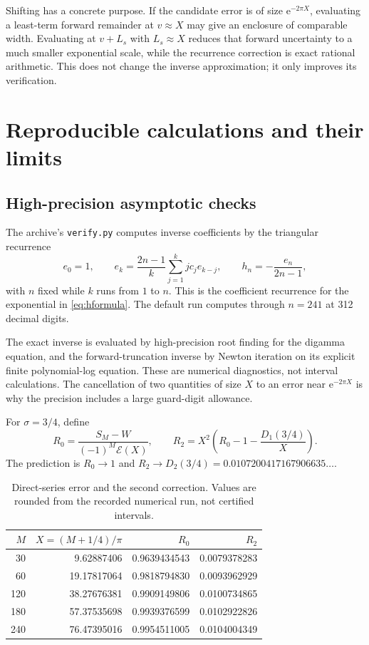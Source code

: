 \documentclass[11pt,a4paper]{article}
\theoremstyle{definition}
\numberwithin{equation}{section}
\newcommand{\e}{\mathrm e}
\newcommand{\scal}{\mathcal E}
\begin{document}
Shifting has a concrete purpose. If the candidate error is of size $\e^{-2\pi X}$, evaluating a least-term forward remainder at $v\approx X$ may give an enclosure of comparable width. Evaluating at $v+L_s$ with $L_s\approx X$ reduces that forward uncertainty to a much smaller exponential scale, while the recurrence correction is exact rational arithmetic. This does not change the inverse approximation; it only improves its verification.

\section{Reproducible calculations and their limits}
\label{sec:verification}

\subsection{High-precision asymptotic checks}
The archive's \texttt{verify.py} computes inverse coefficients by the triangular recurrence
\begin{equation}
 e_0=1,\qquad
 e_k=\frac{2n-1}{k}\sum_{j=1}^k j c_je_{k-j},\qquad
 h_n=-\frac{e_n}{2n-1},
 \label{eq:exprecurrence}
\end{equation}
with $n$ fixed while $k$ runs from $1$ to $n$. This is the coefficient recurrence for the exponential in \eqref{eq:hformula}. The default run computes through $n=241$ at 312 decimal digits.

The exact inverse is evaluated by high-precision root finding for the digamma equation, and the forward-truncation inverse by Newton iteration on its explicit finite polynomial-log equation. These are numerical diagnostics, not interval calculations. The cancellation of two quantities of size $X$ to an error near $\e^{-2\pi X}$ is why the precision includes a large guard-digit allowance.

For $\sigma=3/4$, define
\[
 R_0=\frac{S_M-W}{(-1)^M\scal(X)},\qquad
 R_2=X^2\left(R_0-1-\frac{D_1(3/4)}X\right).
\]
The prediction is $R_0\to1$ and
$R_2\to D_2(3/4)=0.0107200417167906635\ldots$.
\begin{table}[htbp]
\centering\small
\begin{tabular}{rrrr}
\toprule
$M$ & $X=(M+1/4)/\pi$ & $R_0$ & $R_2$\\
\midrule
30  & 9.62887406  & 0.9639434543 & 0.0079378283\\
60  & 19.17817064 & 0.9818794830 & 0.0093962929\\
120 & 38.27676381 & 0.9909149806 & 0.0100734865\\
180 & 57.37535698 & 0.9939376599 & 0.0102922826\\
240 & 76.47395016 & 0.9954511005 & 0.0104004349\\
\bottomrule
\end{tabular}
\caption{Direct-series error and the second correction. Values are rounded from the recorded numerical run, not certified intervals.}
\label{tab:asymptotic}
\end{table}
\end{document}
